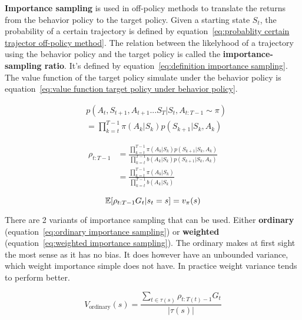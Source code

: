 \textbf{Importance sampling} is used in off-policy methods to translate the returns from the behavior policy to the target policy. Given a starting state $S_t$, the probability of a certain trajectory is defined by equation~\ref{eq:probablity certain trajector off-policy method}. The relation between the likelyhood of a trajectory using the behavior policy and the target policy is called the \textbf{importance-sampling ratio}. It's defined by equation~\ref{eq:definition importance sampling}. The value function of the target policy simulate under the behavior policy is equation~\ref{eq:value function target policy under behavior policy}.

\begin{equation}
\begin{split}
& p(A_t, S_{t+1}, A_{t+1}... S_T| S_t, A_{t:T-1} \sim \pi)\\
& = \prod_{k=t}^{T-1} \pi(A_k | S_k)p(S_{k+1}|S_k, A_k)
\end{split}
\label{eq:probablity certain trajector off-policy method}
\end{equation}

\begin{equation}
\begin{split}
\rho_{t:T-1}
& = \frac{\prod_{k=t}^{T-1} \pi(A_k | S_k)p(S_{k+1}|S_k, A_k)}{\prod_{k=t}^{T-1} b(A_k | S_k)p(S_{k+1}|S_k, A_k)}\\
& = \frac{\prod_{k=t}^{T-1} \pi(A_k | S_k)}{\prod_{k=t}^{T-1} b(A_k | S_k)}
\label{eq:definition importance sampling}
\end{split}
\end{equation}

\begin{equation}
\operatorname{\mathbb{E}}[\rho_{t:T-1} G_t | s_t = s] =  v_{\pi}(s)
\label{eq:value function target policy under behavior policy}
\end{equation}

There are 2 variants of importance sampling that can be used. Either \textbf{ordinary} (equation~\ref{eq:ordinary importance sampling}) or \textbf{weighted} (equation~\ref{eq:weighted importance sampling}). The ordinary makes at first sight the most sense as it has no bias. It does however have an unbounded variance, which weight importance simple does not have. In practice weight variance tends to perform better. 

\begin{equation}
V_{\text{ordinary}}(s) = \frac{\sum_{t\in \tau(s)} \rho_{t:T(t)-1}G_t}{|\tau(s)|}
\label{eq:ordinary importance sampling}
\end{equation}

